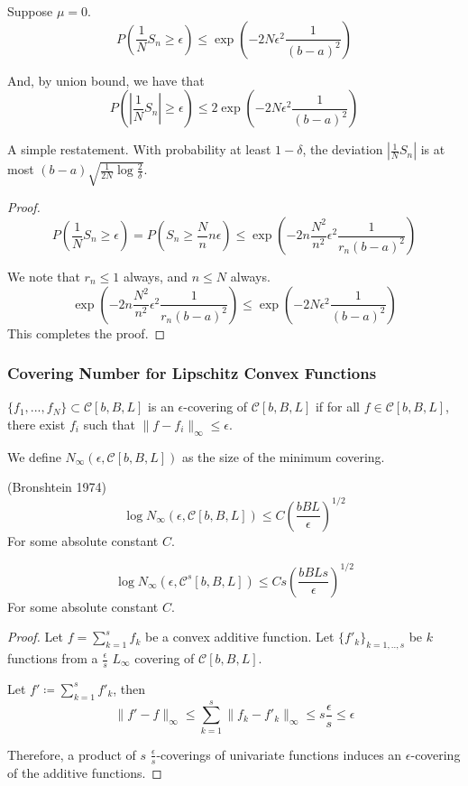 \begin{corollary}
\label{cor:serfling}
Suppose $\mu = 0$. 
\[
P( \frac{1}{N} S_n \geq \epsilon) \leq \exp( -2 N \epsilon^2 \frac{1}{(b-a)^2})
\]

And, by union bound, we have that
\[
P( | \frac{1}{N} S_n| \geq \epsilon) \leq 2 \exp( -2 N \epsilon^2 \frac{1}{(b-a)^2})
\]

\end{corollary}

A simple restatement. With probability at least $1- \delta$, the deviation $| \frac{1}{N} S_n|$ is at most $ (b-a) \sqrt{ \frac{1}{2N} \log \frac{2}{\delta}}$.

\begin{proof}
\[
P( \frac{1}{N} S_n \geq \epsilon) = P( S_n \geq \frac{N}{n} n \epsilon) \leq \exp( - 2 n \frac{N^2}{n^2} \epsilon^2 \frac{1}{r_n (b-a)^2} ) 
\]

We note that $r_n \leq 1$ always, and $n \leq N$ always. 
\[
\exp( - 2 n \frac{N^2}{n^2} \epsilon^2 \frac{1}{r_n (b-a)^2} )  \leq \exp( - 2 N \epsilon^2 \frac{1}{(b-a)^2})
\]
This completes the proof.

\end{proof}

\subsubsection{Covering Number for Lipschitz Convex Functions}

\begin{definition}
$\{ f_1,..., f_N\} \subset \mathcal{C}[b,B,L]$ is an $\epsilon$-covering of $\mathcal{C}[b,B,L]$ if for all $f \in \mathcal{C}[b,B,L]$, there exist $f_i$ such that $\| f - f_i \|_\infty \leq \epsilon$.

We define $N_\infty( \epsilon, \mathcal{C}[b,B,L])$ as the size of the minimum covering.
\end{definition}

\begin{lemma} (Bronshtein 1974)
\[
\log N_\infty (\epsilon, \mathcal{C}[b,B,L]) \leq C\left( \frac{bBL}{\epsilon} \right)^{1/2}
\]
For some absolute constant $C$.
\end{lemma}

\begin{lemma}
\[
\log N_\infty( \epsilon, \mathcal{C}^s[b,B,L])  \leq C s \left(\frac{bBLs}{\epsilon}\right)^{1/2}
\]
For some absolute constant $C$.
\end{lemma}

\begin{proof}
Let $f = \sum_{k=1}^s f_k$ be a convex additive function. Let $\{ f'_k \}_{k=1,..,s}$ be $k$ functions from a $\frac{\epsilon}{s}$ $L_\infty$ covering of $\mathcal{C}[b,B,L]$. 

Let $f' \coloneqq \sum_{k=1}^s f'_k$, then 
\[
\| f' - f \|_{\infty} \leq \sum_{k=1}^s \| f_k - f'_k \|_\infty \leq s \frac{\epsilon}{s} \leq \epsilon
\]

Therefore, a product of $s$ $\frac{\epsilon}{s}$-coverings of univariate functions induces an $\epsilon$-covering of the additive functions.
\end{proof}




 

